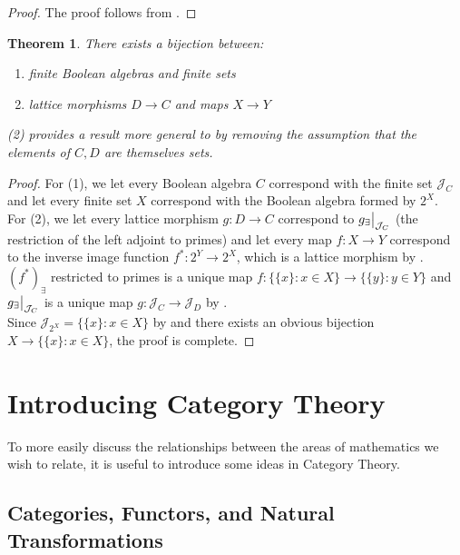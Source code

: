 \documentclass{article}
\newtheorem{theorem}[proposition]{Theorem}
\numberwithin{equation}{section}
\newcommand\restr[2]{{%
  \left.\kern-\nulldelimiterspace %
  #1 %
  \vphantom{\big|} %
  \right|_{#2} %
}}
\begin{document}
\begin{proof}
The proof follows from .
\end{proof}

\begin{theorem} \label{thm:ba-set-bijection}
There exists a bijection between:
\begin{enumerate}
    \item{finite Boolean algebras and finite sets}
    \item{lattice morphisms $D \to C$ and maps $X \to Y$}
\end{enumerate}
(2) provides a result more general to  by removing the assumption that the elements of $C, D$ are themselves sets.
\end{theorem}

\begin{proof}
For (1), we let every Boolean algebra $C$ correspond with the finite set $\mathcal{J}_C$ and let every finite set $X$ correspond with the Boolean algebra formed by $2^X$. \\

For (2), we let every lattice morphism $g : D \to C$ correspond to $\restr{g_\exists}{\mathcal{J}_C}$ (the restriction of the left adjoint to primes) and let every map $f: X \to Y$ correspond to the inverse image function $f^* : 2^Y \to 2^X$, which is a lattice morphism by . $(f^*)_\exists$ restricted to primes is a unique map $f : \{\{x\} : x \in X\} \to \{\{y\} : y \in Y\}$ and $\restr{g_\exists}{\mathcal{J}_C}$ is a unique map $g : \mathcal{J}_C \to \mathcal{J}_D$ by . \\

Since $\mathcal{J}_{2^X} = \{\{x\} : x \in X\}$ by  and there exists an obvious bijection $X \to \{\{x\} : x \in X\}$, the proof is complete.
\end{proof}

\pagebreak

\section{Introducing Category Theory}

To more easily discuss the relationships between the areas of mathematics we wish to relate, it is useful to introduce some ideas in Category Theory. 

\subsection{Categories, Functors, and Natural Transformations}
\end{document}
